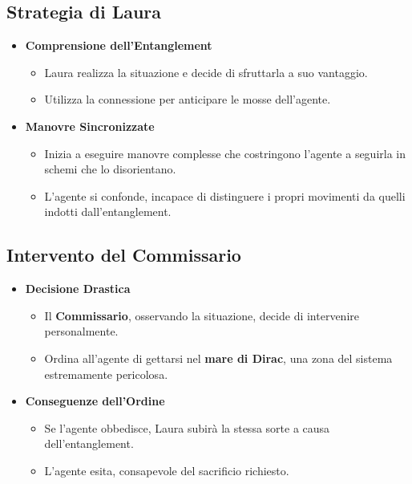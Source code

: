 \subsection*{Strategia di Laura}

\begin{itemize}
    \item \textbf{Comprensione dell'Entanglement}
    \begin{itemize}
        \item Laura realizza la situazione e decide di sfruttarla a suo vantaggio.
        \item Utilizza la connessione per anticipare le mosse dell'agente.
    \end{itemize}

    \item \textbf{Manovre Sincronizzate}
    \begin{itemize}
        \item Inizia a eseguire manovre complesse che costringono l'agente a seguirla in schemi che lo disorientano.
        \item L'agente si confonde, incapace di distinguere i propri movimenti da quelli indotti dall'entanglement.
    \end{itemize}
\end{itemize}

\subsection*{Intervento del Commissario}

\begin{itemize}
    \item \textbf{Decisione Drastica}
    \begin{itemize}
        \item Il \textbf{Commissario}, osservando la situazione, decide di intervenire personalmente.
        \item Ordina all'agente di gettarsi nel \textbf{mare di Dirac}, una zona del sistema estremamente pericolosa.
    \end{itemize}

    \item \textbf{Conseguenze dell'Ordine}
    \begin{itemize}
        \item Se l'agente obbedisce, Laura subirà la stessa sorte a causa dell'entanglement.
        \item L'agente esita, consapevole del sacrificio richiesto.
    \end{itemize}
\end{itemize}

